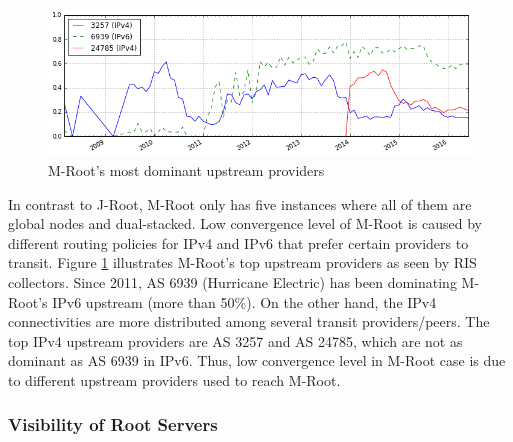 \begin{figure}
		\centering
		\includegraphics[width=5.0in]{img/m_root_top_upstream.png}
	\caption{M-Root's most dominant upstream providers }
	\label{fig:ch04:top_upstream}
\end{figure}

In contrast to J-Root, M-Root only has five instances where all of them are global nodes and dual-stacked. Low convergence level of M-Root is caused by different routing policies for IPv4 and IPv6 that prefer certain providers to transit. Figure \ref{fig:ch04:top_upstream} illustrates M-Root's top upstream providers as seen by RIS collectors. Since 2011, AS 6939 (Hurricane Electric) has been dominating M-Root's IPv6 upstream (more than 50\%). On the other hand, the IPv4 connectivities are more distributed among several transit providers/peers. The top IPv4 upstream providers are AS 3257 and AS 24785, which are not as dominant as AS 6939 in IPv6. Thus, low convergence level in M-Root case is due to different upstream providers used to reach M-Root.

\subsubsection{Visibility of Root Servers}

